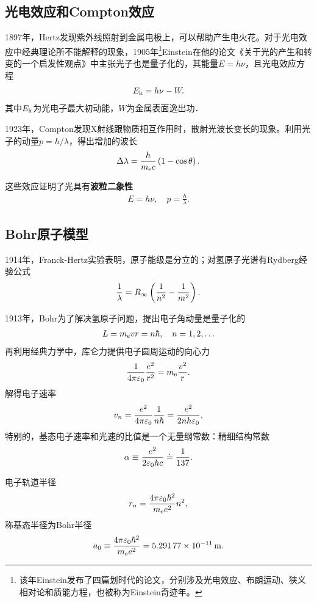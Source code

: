 \subsection{光电效应和Compton效应}
1897年，Hertz发现紫外线照射到金属电极上，可以帮助产生电火花。对于光电效应中经典理论所不能解释的现象，1905年\footnote{该年Einstein发布了四篇划时代的论文，分别涉及光电效应、布朗运动、狭义相对论和质能方程，也被称为Einstein奇迹年。}Einstein在他的论文《关于光的产生和转变的一个启发性观点》中主张光子也是量子化的，其能量$E=h\nu$，且光电效应方程
\begin{align}
	E_{\mathrm k}=h\nu-W.
\end{align}
其中$E_{\mathrm k}$为光电子最大初动能，$W$为金属表面逸出功．

1923年，Compton发现X射线跟物质相互作用时，散射光波长变长的现象。利用光子的动量$p=h/\lambda$，得出增加的波长
\begin{align}
	\Delta\lambda=\frac h{m_\mathrm e c}\left(1-\cos\theta\right).
\end{align}

这些效应证明了光具有\textbf{波粒二象性}
\begin{align}
	E=h\nu,\quad p=\frac h\lambda.
\end{align}
\subsection{Bohr原子模型}
1914年，Franck-Hertz实验表明，原子能级是分立的；对氢原子光谱有Rydberg经验公式
\begin{align}
	\frac1\lambda=R_\infty\left(\frac1{n^2}-\frac1{m^2}\right).
\end{align}

1913年，Bohr为了解决氢原子问题，提出电子角动量是量子化的
\begin{align}
	L=m_\mathrm e vr=n\hbar,\quad n=1,2,\ldots
\end{align}
再利用经典力学中，库仑力提供电子圆周运动的向心力
\[
	\frac1{4\pi\varepsilon_0}\frac{e^2}{r^2}=m_\mathrm e\frac{v^2}r.
\]
解得电子速率
\begin{align}
	v_n=\frac{e^2}{4\pi\varepsilon_0}\frac{1}{n\hbar}=\frac{e^2}{2nh\varepsilon_0},
\end{align}
特别的，基态电子速率和光速的比值是一个无量纲常数：精细结构常数
\[
	\alpha\equiv\frac{e^2}{2\varepsilon_0 hc}\doteq\frac1{137}.
\]

电子轨道半径
\begin{align}
	r_n=\frac{4\pi\varepsilon_0\hbar^2}{m_\mathrm e e^2}n^2,
\end{align}
称基态半径为Bohr半径
\[
a_0\equiv\frac{4\pi\varepsilon_0\hbar^2}{m_\mathrm e e^2}=\SI{5.29177e-11}{m}.
\]

